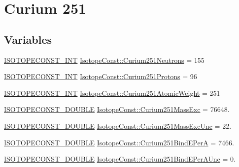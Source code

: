 \hypertarget{group___isotope_const-_curium-_cm251}{}\section{Curium 251}
\label{group___isotope_const-_curium-_cm251}
\subsection*{Variables}
\begin{DoxyCompactItemize}
\item 
\mbox{\hyperlink{group___isotope_const-_macros_ga5f18360b3e99483a35c32d789e62621c}{I\+S\+O\+T\+O\+P\+E\+C\+O\+N\+S\+T\+\_\+\+I\+NT}} \mbox{\hyperlink{group___isotope_const-_curium-_cm251_gac373fdadebd66e17d27a042420c205f0}{Isotope\+Const\+::\+Curium251\+Neutrons}} = 155
\item 
\mbox{\hyperlink{group___isotope_const-_macros_ga5f18360b3e99483a35c32d789e62621c}{I\+S\+O\+T\+O\+P\+E\+C\+O\+N\+S\+T\+\_\+\+I\+NT}} \mbox{\hyperlink{group___isotope_const-_curium-_cm251_gaec0533f93917000f660ca512583e3932}{Isotope\+Const\+::\+Curium251\+Protons}} = 96
\item 
\mbox{\hyperlink{group___isotope_const-_macros_ga5f18360b3e99483a35c32d789e62621c}{I\+S\+O\+T\+O\+P\+E\+C\+O\+N\+S\+T\+\_\+\+I\+NT}} \mbox{\hyperlink{group___isotope_const-_curium-_cm251_ga1bd8c6e2efe1f78b5f18ba691e324e39}{Isotope\+Const\+::\+Curium251\+Atomic\+Weight}} = 251
\item 
\mbox{\hyperlink{group___isotope_const-_macros_ga8f45a7272ce02c0b4c65c44636ed719a}{I\+S\+O\+T\+O\+P\+E\+C\+O\+N\+S\+T\+\_\+\+D\+O\+U\+B\+LE}} \mbox{\hyperlink{group___isotope_const-_curium-_cm251_ga1843538e8623aa1826f7082df5bde25b}{Isotope\+Const\+::\+Curium251\+Mass\+Exc}} = 76648.
\item 
\mbox{\hyperlink{group___isotope_const-_macros_ga8f45a7272ce02c0b4c65c44636ed719a}{I\+S\+O\+T\+O\+P\+E\+C\+O\+N\+S\+T\+\_\+\+D\+O\+U\+B\+LE}} \mbox{\hyperlink{group___isotope_const-_curium-_cm251_ga812cfaf6d19f2ccd9fd9885dea370c23}{Isotope\+Const\+::\+Curium251\+Mass\+Exc\+Unc}} = 22.
\item 
\mbox{\hyperlink{group___isotope_const-_macros_ga8f45a7272ce02c0b4c65c44636ed719a}{I\+S\+O\+T\+O\+P\+E\+C\+O\+N\+S\+T\+\_\+\+D\+O\+U\+B\+LE}} \mbox{\hyperlink{group___isotope_const-_curium-_cm251_ga62d0f99bad6a9601ce159b822391cb65}{Isotope\+Const\+::\+Curium251\+Bind\+E\+PerA}} = 7466.
\item 
\mbox{\hyperlink{group___isotope_const-_macros_ga8f45a7272ce02c0b4c65c44636ed719a}{I\+S\+O\+T\+O\+P\+E\+C\+O\+N\+S\+T\+\_\+\+D\+O\+U\+B\+LE}} \mbox{\hyperlink{group___isotope_const-_curium-_cm251_ga288848322fc6b44bc917d16bfca29946}{Isotope\+Const\+::\+Curium251\+Bind\+E\+Per\+A\+Unc}} = 0.

\end{DoxyCompactItemize}

